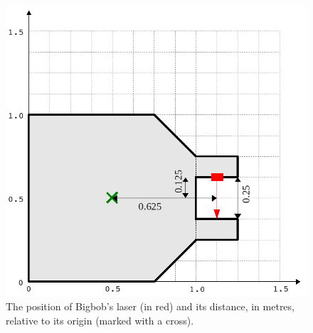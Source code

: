 \documentclass[a4paper]{report}
\begin{document}
\begin{figure}
	\centering
	\includegraphics[width=0.6\linewidth]{./pics/robot_building/bigbob_laser.png} 
	\caption{The position of Bigbob's laser (in red) and its distance, in metres, relative to its origin (marked with a cross).}
	\label{fig:laserdrawing}
\end{figure}
\end{document}
